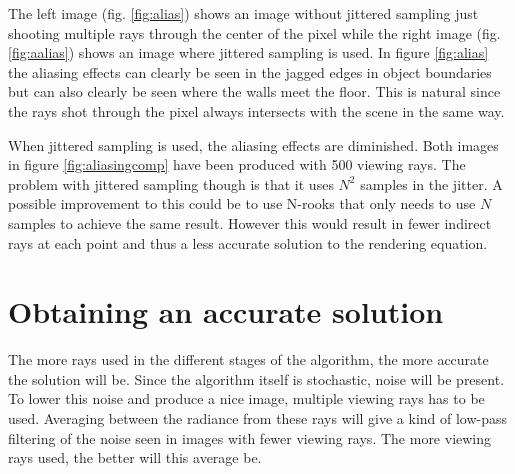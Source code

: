 \documentclass[a4paper]{report}
\begin{document}
The left image (fig. \ref{fig:alias}) shows an image
without jittered sampling just shooting multiple rays through the
center of the pixel while the right image (fig. \ref{fig:aalias}) shows an image where
jittered sampling is used. In figure \ref{fig:alias} the aliasing
effects can clearly be seen in the jagged edges in object boundaries
but can also clearly be seen where the walls meet the floor. This is
natural since the rays shot through the pixel always intersects with
the scene in the same way.

When jittered sampling is used, the aliasing effects are
diminished. Both images in figure \ref{fig:aliasingcomp} have been
produced with 500 viewing rays. The problem with jittered sampling
though is that it uses \(N^2\) samples in the jitter. A possible
improvement to this could be to use N-rooks that only needs to use
\(N\) samples to achieve the same result. However this would result in
fewer indirect rays at each point and thus a less accurate solution to
the rendering equation.

\section{Obtaining an accurate solution}

The more rays used in the different stages of the algorithm, the more
accurate the solution will be. Since the algorithm itself is
stochastic, noise will be present. To lower this noise and produce a
nice image, multiple viewing rays has to be used. Averaging between
the radiance from these rays will give a kind of low-pass filtering of
the noise seen in images with fewer viewing rays. The more viewing
rays used, the better will this average be.
\end{document}
